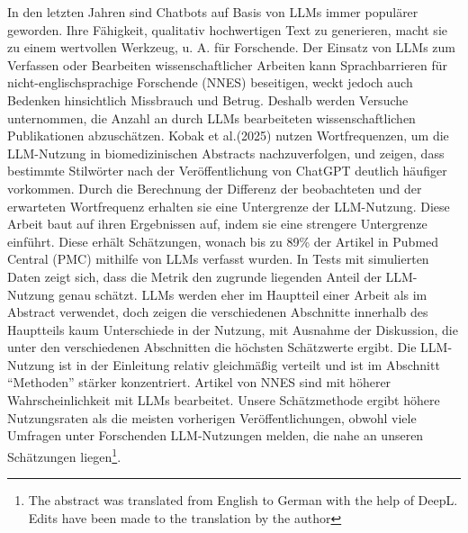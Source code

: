 \documentclass[12pt,a4paper]{report}
\begin{document}
In den letzten Jahren sind Chatbots auf Basis von LLMs immer populärer geworden. Ihre Fähigkeit, qualitativ hochwertigen Text zu generieren, macht sie zu einem wertvollen Werkzeug, u. A. für Forschende. Der Einsatz von LLMs zum Verfassen oder Bearbeiten wissenschaftlicher Arbeiten kann Sprachbarrieren für nicht-englischsprachige Forschende (NNES) beseitigen, weckt jedoch auch Bedenken hinsichtlich Missbrauch und Betrug.  Deshalb werden Versuche unternommen, die Anzahl an durch LLMs bearbeiteten wissenschaftlichen Publikationen abzuschätzen. Kobak et al.(2025) nutzen Wortfrequenzen, um die LLM-Nutzung in biomedizinischen Abstracts nachzuverfolgen, und zeigen, dass bestimmte Stilwörter nach der Veröffentlichung von ChatGPT deutlich häufiger vorkommen. Durch die Berechnung der Differenz der beobachteten und der erwarteten Wortfrequenz erhalten sie eine Untergrenze der LLM-Nutzung. Diese Arbeit baut auf ihren Ergebnissen auf, indem sie eine strengere Untergrenze einführt. Diese erhält Schätzungen, wonach bis zu 89\% der Artikel in Pubmed Central (PMC) mithilfe von LLMs verfasst wurden. In Tests mit simulierten Daten zeigt sich, dass die Metrik den zugrunde liegenden Anteil der LLM-Nutzung genau schätzt. LLMs werden eher im Hauptteil einer Arbeit als im Abstract verwendet, doch zeigen die verschiedenen Abschnitte innerhalb des Hauptteils kaum Unterschiede in der Nutzung, mit Ausnahme der Diskussion, die unter den verschiedenen Abschnitten die höchsten Schätzwerte ergibt. Die LLM-Nutzung ist in der Einleitung relativ gleichmäßig verteilt und ist im Abschnitt ``Methoden'' stärker konzentriert. Artikel von NNES sind mit höherer Wahrscheinlichkeit mit LLMs bearbeitet. Unsere Schätzmethode ergibt höhere Nutzungsraten als die meisten vorherigen Veröffentlichungen, obwohl viele Umfragen unter Forschenden LLM-Nutzungen melden, die nahe an unseren Schätzungen liegen\footnote{The abstract was translated from English to German with the help of DeepL. Edits have been made to the translation by the author}. 


\newpage


\tableofcontents
\newpage










\printbibliography

\appendix





\end{document}
